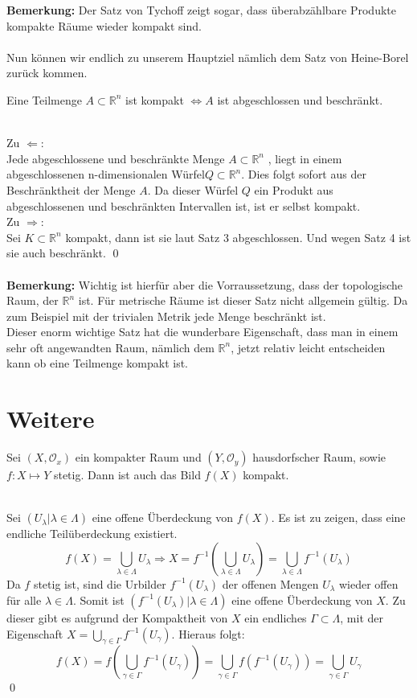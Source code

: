 	{\bf Bemerkung:} Der Satz von Tychoff zeigt sogar, dass überabzählbare Produkte kompakte Räume wieder kompakt sind. \\
	\\
	Nun können wir endlich zu unserem Hauptziel nämlich dem Satz von Heine-Borel zurück kommen.
	\begin{Satz}
		Eine Teilmenge  \( A \subset \mathbb{R}^n \) ist kompakt \(\Leftrightarrow A \) ist abgeschlossen und beschränkt.
	\end{Satz}
	 \\
		Zu \(\Leftarrow \): \\
		Jede abgeschlossene und beschränkte Menge \(A \subset\mathbb{R}^n \) , liegt in einem abgeschlossenen n-dimensionalen Würfel\( Q \subset \mathbb{R}^n \). Dies folgt sofort aus der 
		Beschränktheit der Menge \(A\). Da dieser Würfel \( Q \) ein Produkt aus abgeschlossenen und beschränkten Intervallen ist, ist er selbst kompakt.
		\\
		Zu \(\Rightarrow \): \\
		Sei \( K \subset \mathbb{R}^n \) kompakt, dann ist sie laut Satz 3 abgeschlossen. Und wegen Satz 4 ist sie auch beschränkt.
	\qed \\
	\\
	{\bf Bemerkung:} Wichtig ist hierfür aber die Vorraussetzung, dass der topologische Raum, der \(\mathbb{R}^n \) ist. Für metrische Räume ist dieser Satz nicht allgemein gültig. 
	Da zum Beispiel mit der trivialen Metrik jede Menge beschränkt ist.\\
	Dieser enorm wichtige Satz hat die wunderbare Eigenschaft, dass man in einem sehr oft angewandten Raum, nämlich dem \(\mathbb{R}^n \), 
	jetzt relativ leicht entscheiden kann ob eine Teilmenge kompakt ist. 
\section{Weitere}
% 
\begin{Satz}\label{satz:ftk:kompakt}
	Sei \( (X, \mathcal{O}_x) \) ein kompakter Raum und \((Y, \mathcal{O}_y)\) hausdorfscher Raum, sowie \(f: X \mapsto Y\) stetig.
	Dann ist auch das Bild \( f(X) \) kompakt.
\end{Satz}
%
	\\
	Sei \( (U_{\lambda} | \lambda \in \Lambda) \) eine offene Überdeckung von \(f(X)\). Es ist zu zeigen,
	dass eine endliche Teilüberdeckung existiert. 
	\[ f(X) = \bigcup_{\lambda \in \Lambda} U_{\lambda} \Rightarrow X = 
  	 f^{-1}(\bigcup_{\lambda \in \Lambda} U_{\lambda}) = 
		 \bigcup_{\lambda \in \Lambda} f^{-1}(U_{\lambda}) \]
	Da \(f\) stetig ist, sind die Urbilder \( f^{-1}(U_{\lambda}) \) der offenen Mengen \(U_{\lambda}\) wieder offen für 
	alle \(\lambda \in \Lambda\). Somit ist \( ( f^{-1}(U_{\lambda}) | \lambda \in \Lambda ) \) eine offene Überdeckung
	von \(X\). Zu dieser gibt es aufgrund der Kompaktheit von \(X\) ein endliches \( \Gamma \subset \Lambda \), mit 
	der Eigenschaft \( X = \bigcup_{\gamma \in \Gamma} f^{-1}(U_{\gamma}) \). Hieraus folgt:
	\[ f(X) = f(\bigcup_{\gamma \in \Gamma} f^{-1}(U_{\gamma})) = 
  	 \bigcup_{\gamma \in \Gamma} f(f^{-1}(U_{\gamma})) = 
	   \bigcup_{\gamma \in \Gamma} U_{\gamma} \]
\qed

